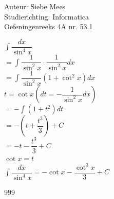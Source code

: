 \documentclass[a4paper]{article}
\begin{document}
  
\noindent \large Auteur: Siebe Mees \\
\noindent \large Studierichting: Informatica\\
\noindent \large Oefeningenreeks 4A nr. 53.1\\

\medskip

\normalsize

$ \displaystyle\int \dfrac{dx}{\sin^4 x} $\\

$ = \displaystyle\int \dfrac{1}{\sin^2 x} \cdot \dfrac{1}{\sin^2 x} dx $\\

$ = \displaystyle\int \dfrac{1}{\sin^2 x} \left( 1 + \cot^2 x \right) dx $\\

$ t = \cot x \left( dt = -\dfrac{1}{\sin^2 x} dx \right) $\\

$ = -\displaystyle\int \left( 1 + t^2 \right) dt $\\

$ = -\left( t + \dfrac{t^3}{3} \right) + C $\\

$ = -t - \dfrac{t^3}{3} + C $\\

$ \cot x = t $\\

$ \displaystyle\int \dfrac{dx}{\sin^4 x} = -\cot x - \dfrac{\cot^3 x}{3} + C $\\

\begin{thebibliography}{999}
\end{thebibliography}
\end{document}

